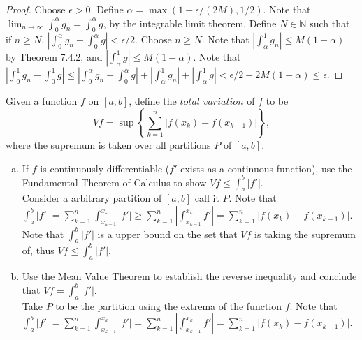\documentclass[12pt]{article}
\makeatletter
\theoremstyle{homework}
\newenvironment{exercise}[1]
{\def\@currentlabel{#1}\exercisecore}
{\endexercisecore}
\makeatother
\begin{document}
\begin{proof}
Choose $\epsilon>0$.  Define $\alpha=\max(1-\epsilon/(2M),1/2)$.  Note that $\lim_{n\to\infty}\int_0^\alpha g_n=\int_0^\alpha g$, by the integrable limit theorem.  Define $N\in\mathbb{N}$ such that if $n\geq N$, $|\int_0^\alpha g_n-\int_0^\alpha g|<\epsilon/2$.  Choose $n\geq N$.  Note that $|\int_\alpha^1 g_n|\leq M(1-\alpha)$ by Theorem 7.4.2, and $|\int_\alpha^1 g|\leq M(1-\alpha)$.  Note that $|\int_0^1 g_n-\int_0^1 g|\leq |\int_0^\alpha g_n-\int_0^\alpha g|+|\int_\alpha^1 g_n|+|\int_\alpha^1 g|<\epsilon/2+2M(1-\alpha)\leq\epsilon$.
\end{proof}


\begin{exercise}{12} Given a function $f$ on $[a,b]$, define the $total$ $variation$ of $f$ to be $$Vf = \sup \left \{ \sum_{k=1}^n |f(x_k) - f(x_{k-1})| \right \} ,$$ where the supremum is taken over all partitions $P$ of $[a,b]$.
\end{exercise}
\begin{enumerate}[(a)]
\item If $f$ is continuously differentiable ($f'$ exists as a continuous function), use the Fundamental Theorem of Calculus to show $Vf \le \int_a^b|f'|$.\\
Consider a arbitrary partition of $[a,b]$ call it $P$.  Note that $\int_a^b|f'|=\sum_{k=1}^n \int_{x_{k-1}}^{x_k}|f'|\geq \sum_{k=1}^n |\int_{x_{k-1}}^{x_k}f'|=\sum_{k=1}^n |f(x_k) - f(x_{k-1})|$.  Note that $\int_a^b|f'|$ is a upper bound on the set that $Vf$ is taking the supremum of, thus $Vf \le \int_a^b|f'|$.
\item Use the Mean Value Theorem to establish the reverse inequality and conclude that $Vf = \int_a^b|f'|$.\\
Take $P$ to be the partition using the extrema of the function $f$.  Note that $\int_a^b|f'|=\sum_{k=1}^n \int_{x_{k-1}}^{x_k}|f'|= \sum_{k=1}^n |\int_{x_{k-1}}^{x_k}f'|=\sum_{k=1}^n |f(x_k) - f(x_{k-1})|$.
\end{enumerate}
\end{document}
